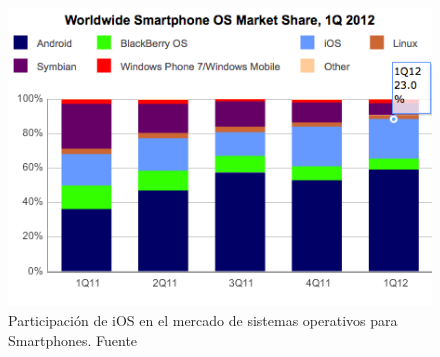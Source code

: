 \begin{figure}[H]
	\centering
	\includegraphics[scale=0.8]{imgs/market-share-2012q1.png} 
	\caption{Participación de iOS en el mercado de sistemas operativos para Smartphones. Fuente \cite{sota:market-smartphones}}
	\label{market-share-2012q1}
\end{figure}





	



